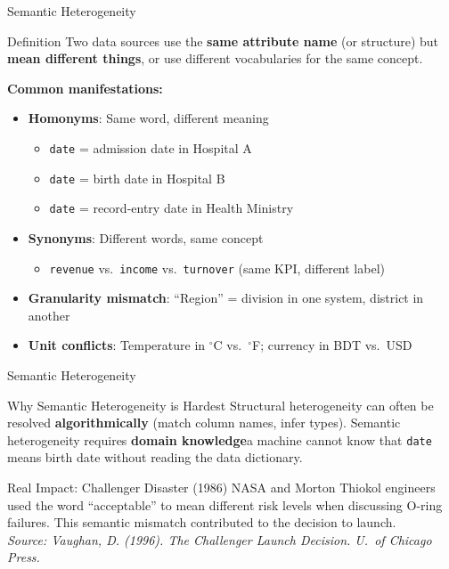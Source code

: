 \documentclass[aspectratio=169,10pt]{beamer}
\begin{document}
\begin{frame}{Semantic Heterogeneity}
  
      \begin{block}{Definition}
        Two data sources use the \textbf{same attribute name} (or structure) but \textbf{mean different things}, or use different vocabularies for the same concept.
      \end{block}
      \vspace{6pt}
      \textbf{Common manifestations:}
      \begin{itemize}
        \item \textbf{Homonyms}: Same word, different meaning
        \begin{itemize}
          \small
          \item \texttt{date} = admission date in Hospital A
          \item \texttt{date} = birth date in Hospital B
          \item \texttt{date} = record-entry date in Health Ministry
        \end{itemize}
        \item \textbf{Synonyms}: Different words, same concept
        \begin{itemize}
          \small
          \item \texttt{revenue} vs.\ \texttt{income} vs.\ \texttt{turnover} (same KPI, different label)
        \end{itemize}
        \item \textbf{Granularity mismatch}: ``Region'' = division in one system, district in another
        \item \textbf{Unit conflicts}: Temperature in $^\circ$C vs.\ $^\circ$F; currency in BDT vs.\ USD
      \end{itemize}

     
\end{frame}
\begin{frame}{Semantic Heterogeneity}
  
      \begin{alertblock}{Why Semantic Heterogeneity is Hardest}
        Structural heterogeneity can often be resolved \textbf{algorithmically} (match column names, infer types).  Semantic heterogeneity requires \textbf{domain knowledge}\textemdash a machine cannot know that \texttt{date} means birth date without reading the data dictionary.
      \end{alertblock}
      \vspace{6pt}
      \begin{exampleblock}{Real Impact: Challenger Disaster (1986)}
        NASA and Morton Thiokol engineers used the word ``acceptable'' to mean different risk levels when discussing O-ring failures.  This semantic mismatch contributed to the decision to launch.\\[4pt]
        \textit{Source: Vaughan, D. (1996). \textit{The Challenger Launch Decision}. U.\ of Chicago Press.}
      \end{exampleblock}
 
\end{frame}
\end{document}
